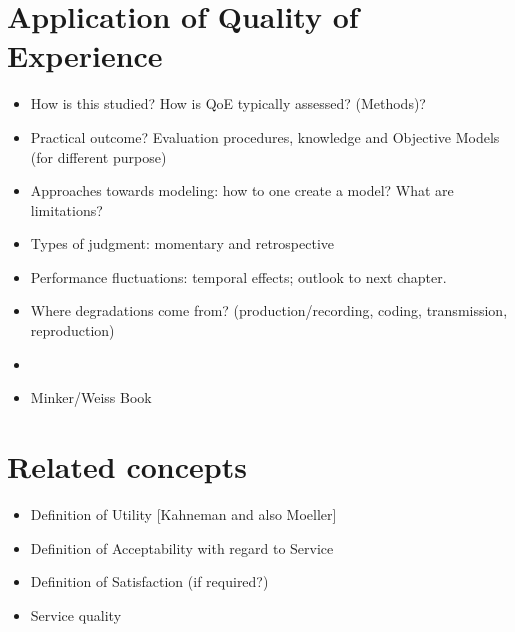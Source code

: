 \section{Application of Quality of Experience}
\begin{itemize}
\item How is this studied? How is QoE typically assessed? (Methods)? 
\item Practical outcome? Evaluation procedures, knowledge and Objective Models (for different purpose)

\item Approaches towards modeling: how to one create a model? What are limitations?
\item Types of judgment: momentary and retrospective
\item Performance fluctuations: temporal effects; outlook to next chapter.
\item Where degradations come from? (production/recording, coding, transmission, reproduction)
\item \cite{pitrey_aligning_2011}
\item Minker/Weiss Book
\end{itemize}


\section{Related concepts}
\begin{itemize}
\item Definition of Utility [Kahneman and also Moeller]
\item Definition of Acceptability with regard to Service
\item Definition of Satisfaction (if required?)
\item Service quality
\end{itemize}
